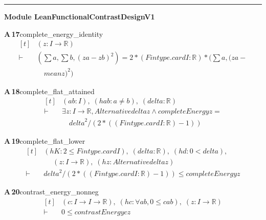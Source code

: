 \documentclass[conference]{IEEEtran}
\theoremstyle{definition}
\newcommand{\lean}[1]{\textsf{\footnotesize #1}}
\begin{document}
\vspace{4pt}\noindent\rule{\columnwidth}{0.4pt}\par\vspace{2pt}
\noindent\textbf{Module \lean{LeanFunctionalContrastDesignV1}}\par\vspace{3pt}

\noindent\textbf{A\,17}\quad\lean{complete\_energy\_identity}
{\footnotesize\[ \begin{aligned}[t]
&(\mathit{z} : \mathit{I} \to \mathbb{R} )\\
\vdash\;&(\textstyle\sum \mathit{a},\textstyle\sum \mathit{b},(\mathit{z} \mathit{a}-\mathit{z} \mathit{b})^{2})=2*(\mathit{Fintype}.\mathit{card} \mathit{I}:\mathbb{R} )*(\textstyle\sum \mathit{a},(\mathit{z} \mathit{a}-\\
&\quad \mathit{mean} \mathit{z})^{2})
\end{aligned} \]}

\noindent\textbf{A\,18}\quad\lean{complete\_flat\_attained}
{\footnotesize\[ \begin{aligned}[t]
&(\mathit{a} \mathit{b} : \mathit{I}),\; (\mathit{hab} : \mathit{a} \neq \mathit{b}),\; (\mathit{delta} : \mathbb{R} )\\
\vdash\;&\exists \mathit{z} : \mathit{I} \to \mathbb{R} ,\mathit{Alternative} \mathit{delta} \mathit{z} \wedge \mathit{completeEnergy} \mathit{z}=\\
&\quad \mathit{delta}^{2}/(2*((\mathit{Fintype}.\mathit{card} \mathit{I}:\mathbb{R} )-1))
\end{aligned} \]}

\noindent\textbf{A\,19}\quad\lean{complete\_flat\_lower}
{\footnotesize\[ \begin{aligned}[t]
&(\mathit{hK} : 2 \leq \mathit{Fintype}.\mathit{card} \mathit{I}),\; (\mathit{delta} : \mathbb{R} ),\; (\mathit{hd} : 0 < \mathit{delta}),\\
&\quad \; (\mathit{z} : \mathit{I} \to \mathbb{R} ),\; (\mathit{hz} : \mathit{Alternative} \mathit{delta} \mathit{z})\\
\vdash\;&\mathit{delta}^{2}/(2*((\mathit{Fintype}.\mathit{card} \mathit{I}:\mathbb{R} )-1)) \leq \mathit{completeEnergy} \mathit{z}
\end{aligned} \]}

\noindent\textbf{A\,20}\quad\lean{contrast\_energy\_nonneg}
{\footnotesize\[ \begin{aligned}[t]
&(\mathit{c} : \mathit{I} \to \mathit{I} \to \mathbb{R} ),\; (\mathit{hc} : \forall \mathit{a} \mathit{b},0 \leq \mathit{c} \mathit{a} \mathit{b}),\; (\mathit{z} : \mathit{I} \to \mathbb{R} )\\
\vdash\;&0 \leq \mathit{contrastEnergy} \mathit{c} \mathit{z}
\end{aligned} \]}
\end{document}
